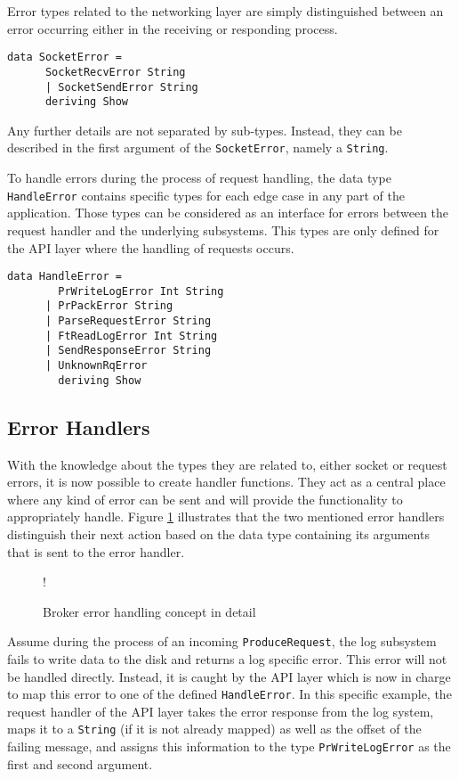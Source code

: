 Error types related to the networking layer are simply distinguished between an
error occurring either in the receiving or responding process.

\begin{lstlisting}[caption={SocketError types}]
data SocketError =
      SocketRecvError String
      | SocketSendError String
      deriving Show
\end{lstlisting}

Any further details are not separated by sub-types. Instead, they can be
described in the first argument of the \lstinline{SocketError}, namely a
\lstinline{String}.

To handle errors during the process of request handling, the data type
\lstinline{HandleError} contains specific types for each edge case in any part
of the application. Those types can be considered as an interface for errors
between the request handler and the underlying subsystems. This types are only
defined for the API layer where the handling of requests occurs.

\begin{lstlisting}[caption={Handle Error types}] 
data HandleError =
        PrWriteLogError Int String
      | PrPackError String
      | ParseRequestError String
      | FtReadLogError Int String
      | SendResponseError String
      | UnknownRqError
        deriving Show
\end{lstlisting}

\subsection{Error Handlers}

With the knowledge about the types they are related to, either socket or request
errors, it is now possible to create handler functions. They act as a central
place where any kind of error can be sent and will provide the functionality to
appropriately handle. Figure \ref{fig:broker-error-activity-detail} illustrates
that the two mentioned error handlers distinguish their next action based on the
data type containing its arguments that is sent to the error handler.

\begin{figure}[H]
  \centering
  \resizebox {0.7\linewidth} {!} {
    
  }
  \caption{Broker error handling concept in detail}
  \label{fig:broker-error-activity-detail}
\end{figure}

Assume during the process of an incoming \lstinline{ProduceRequest}, the log
subsystem fails to write data to the disk and returns a log specific error. This
error will not be handled directly. Instead, it is caught by the API layer
which is now in charge to map this error to one of the defined
\lstinline{HandleError}. In this specific example, the request handler of the
API layer takes the error response from the log system, maps it to a
\lstinline{String} (if it is not already mapped) as well as the offset of the
failing message, and assigns this information to the type
\lstinline{PrWriteLogError} as the first and second argument. \\

